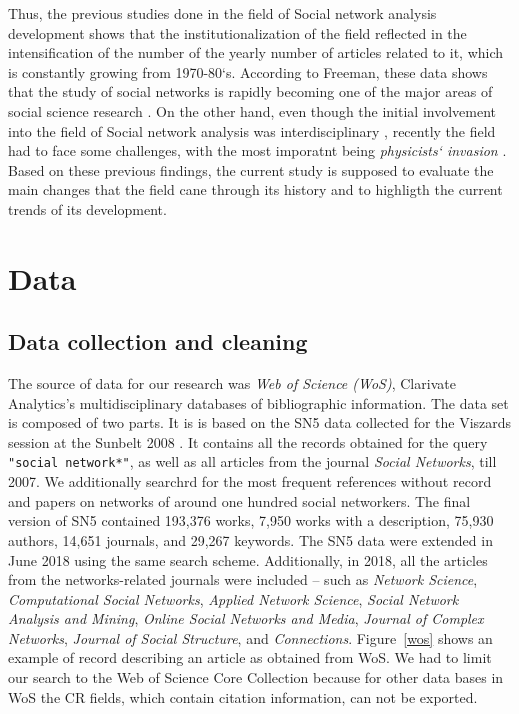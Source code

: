 \documentclass[11pt]{article} %
\begin{document}
Thus, the previous studies done in the field of Social network analysis development shows that the institutionalization of the field reflected in the intensification of the number of the yearly number of articles related to it, which is constantly growing from 1970-80`s. According to Freeman, these data shows that the study of social networks is rapidly becoming one of the major areas of social science research  \citep{SNAdev}. On the other hand, even though the initial involvement into the field of Social network analysis was interdisciplinary \citep{normSci}, recently the field had to face  some challenges, with the most imporatnt being \textit{physicists` invasion} \citep{lazer,brandes,Understand}. Based on these previous findings, the current study is supposed to evaluate the main changes that the field cane through its history and to highligth the current trends of its development. \medskip


\section{Data}

\subsection{Data collection and cleaning}

The source of data for our research was \textit{Web of Science (WoS)}, Clarivate Analytics’s multidisciplinary databases of bibliographic information. The data set is composed of two parts. It is is based on the  SN5 data collected for the Viszards session at the Sunbelt 2008 \citep{Understand}. It contains all the records obtained for the query  \texttt {"social network*"}, as well as all articles from the journal \textit{Social Networks}, till 2007. We additionally searchrd for the most frequent references without record and papers on networks of around one hundred social networkers. The final version of SN5 contained 193,376 works,  7,950 works with a description,  75,930 authors,  14,651 journals, and  29,267 keywords. The SN5 data were extended  in June 2018 using the same search scheme. Additionally, in 2018, all the articles from the networks-related journals were included -- such as  \textit{Network Science}, \textit{Computational Social Networks}, \textit{Applied Network Science}, \textit{Social Network Analysis and Mining}, \textit{Online Social Networks and Media}, \textit{Journal of Complex  Networks}, \textit{Journal of Social Structure}, and \textit{Connections}. Figure~\ref{wos} shows an example of record describing an article as obtained from WoS. We had to limit our search to the Web of Science Core Collection because for other data bases in WoS the CR fields, which contain citation information, can not be exported.
\end{document}
